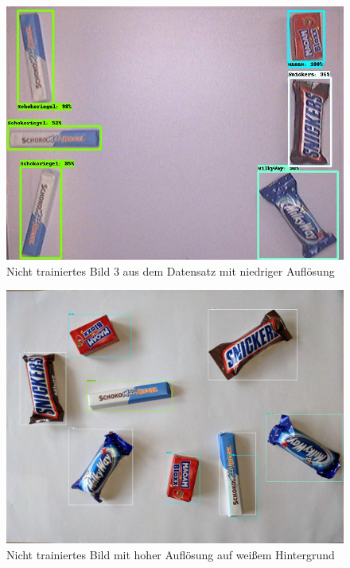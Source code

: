     \begin{figure}[H]
        \centering
        \includegraphics[angle = 90, width = \textwidth]{Bilder/models/model_comparison/ssd_resnet50_v1_fpn_640x640_coco17_tpu-8/non_trained_3.jpg}
        \caption{Nicht trainiertes Bild 3 aus dem Datensatz mit niedriger Auflösung}
    \end{figure}
    
    \begin{figure}[H]
        \centering
        \includegraphics[angle = 90, width = \textwidth]{Bilder/models/model_comparison/ssd_resnet50_v1_fpn_640x640_coco17_tpu-8/HD_on_white.jpg}
        \caption{Nicht trainiertes Bild mit hoher Auflösung auf weißem Hintergrund}
    \end{figure}
    
